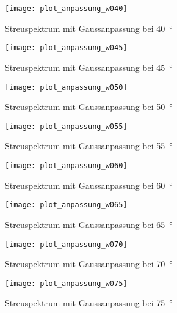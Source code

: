 \documentclass[11pt, ngerman, fleqn, DIV=15, headinclude, BCOR=2cm]{scrreprt}
\begin{document}
\begin{appendix}
\begin{figure}[h]
    \centering
    \texttt{[image: plot\_anpassung\_w040]}
    \caption{%
	    Streuspektrum mit Gaussanpassung bei \SI{40}{\degree}
    }
    \label{fig:plot_anpassung_w040}
\end{figure}

\begin{figure}[h]
    \centering
    \texttt{[image: plot\_anpassung\_w045]}
    \caption{%
	    Streuspektrum mit Gaussanpassung bei \SI{45}{\degree}
    }
    \label{fig:plot_anpassung_w045}
\end{figure}

\begin{figure}[h]
    \centering
    \texttt{[image: plot\_anpassung\_w050]}
    \caption{%
	    Streuspektrum mit Gaussanpassung bei \SI{50}{\degree}
    }
    \label{fig:plot_anpassung_w050}
\end{figure}

\begin{figure}[h]
    \centering
    \texttt{[image: plot\_anpassung\_w055]}
    \caption{%
	    Streuspektrum mit Gaussanpassung bei \SI{55}{\degree}
    }
    \label{fig:plot_anpassung_w055}
\end{figure}

\begin{figure}[h]
    \centering
    \texttt{[image: plot\_anpassung\_w060]}
    \caption{%
	    Streuspektrum mit Gaussanpassung bei \SI{60}{\degree}
    }
    \label{fig:plot_anpassung_w060}
\end{figure}

\begin{figure}[h]
    \centering
    \texttt{[image: plot\_anpassung\_w065]}
    \caption{%
	    Streuspektrum mit Gaussanpassung bei \SI{65}{\degree}
    }
    \label{fig:plot_anpassung_w065}
\end{figure}

\begin{figure}[h]
    \centering
    \texttt{[image: plot\_anpassung\_w070]}
    \caption{%
	    Streuspektrum mit Gaussanpassung bei \SI{70}{\degree}
    }
    \label{fig:plot_anpassung_w070}
\end{figure}

\begin{figure}[h]
    \centering
    \texttt{[image: plot\_anpassung\_w075]}
    \caption{%
	    Streuspektrum mit Gaussanpassung bei \SI{75}{\degree}
    }
    \label{fig:plot_anpassung_w075}
\end{figure}


\end{appendix}
\end{document}
